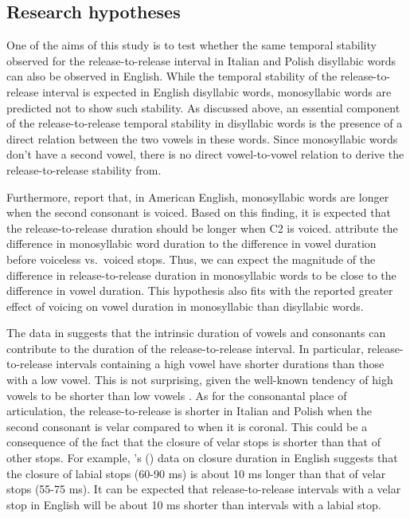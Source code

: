 \documentclass[
  12pt,
  a4paper,
]{article}
\begin{document}
\hypertarget{research-hypotheses}{%
\subsection{Research hypotheses}\label{research-hypotheses}}

\label{s:hypo}

One of the aims of this study is to test whether the same temporal
stability observed for the release-to-release interval in Italian and
Polish disyllabic words can also be observed in English. While the
temporal stability of the release-to-release interval is expected in
English disyllabic words, monosyllabic words are predicted not to show
such stability. As discussed above, an essential component of the
release-to-release temporal stability in disyllabic words is the
presence of a direct relation between the two vowels in these words.
Since monosyllabic words don't have a second vowel, there is no direct
vowel-to-vowel relation to derive the release-to-release stability from.

Furthermore, \citet{jacewicz2009} report that, in American English,
monosyllabic words are longer when the second consonant is voiced. Based
on this finding, it is expected that the release-to-release duration
should be longer when C2 is voiced. \citet{jacewicz2009} attribute the
difference in monosyllabic word duration to the difference in vowel
duration before voiceless vs.~voiced stops. Thus, we can expect the
magnitude of the difference in release-to-release duration in
monosyllabic words to be close to the difference in vowel duration. This
hypothesis also fits with the reported greater effect of voicing on
vowel duration in monosyllabic than disyllabic words.

The data in \citet{coretta2018j} suggests that the intrinsic duration of
vowels and consonants can contribute to the duration of the
release-to-release interval. In particular, release-to-release intervals
containing a high vowel have shorter durations than those with a low
vowel. This is not surprising, given the well-known tendency of high
vowels to be shorter than low vowels
\citep{hertrich1997, esposito2002, mortensen2013, toivonen2015, kawahara2017}.
As for the consonantal place of articulation, the release-to-release is
shorter in Italian and Polish when the second consonant is velar
compared to when it is coronal. This could be a consequence of the fact
that the closure of velar stops is shorter than that of other stops. For
example, \citeauthor{sharf1962}'s (\citeyear{sharf1962}) data on closure
duration in English suggests that the closure of labial stops (60-90 ms)
is about 10 ms longer than that of velar stops (55-75 ms). It can be
expected that release-to-release intervals with a velar stop in English
will be about 10 ms shorter than intervals with a labial stop.
\end{document}
